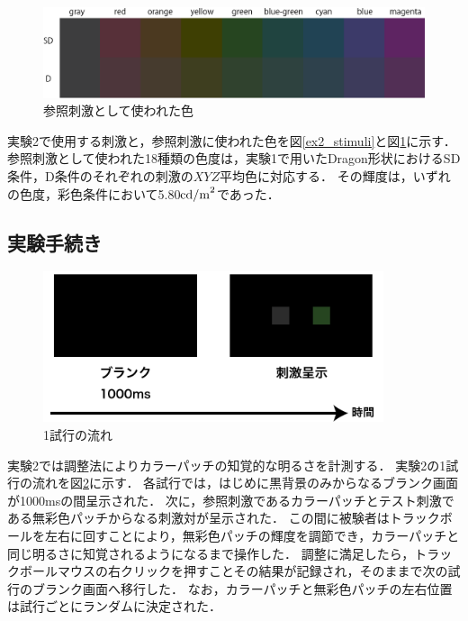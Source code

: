             \begin{figure}[h]
                \centering
                \includegraphics[width=14.0cm]{./img/ex2_stimuli_p.png}
                \caption{参照刺激として使われた色}
                \label{ex2_stimuli_set}
            \end{figure}
            \newpage

            実験2で使用する刺激と，参照刺激に使われた色を図\ref{ex2_stimuli}と図\ref{ex2_stimuli_set}に示す．
            参照刺激として使われた18種類の色度は，実験1で用いたDragon形状におけるSD条件，D条件のそれぞれの刺激の$XYZ$平均色に対応する．
            その輝度は，いずれの色度，彩色条件において5.80${\rm cd/m}^2$であった．

        \subsection{実験手続き}

            \begin{figure}[h]
                \centering
                \includegraphics[width=10.0cm]{./img/ex2_procedure.png}
                \caption{1試行の流れ}
                \label{ex2_procedure}
            \end{figure}

            実験2では調整法によりカラーパッチの知覚的な明るさを計測する．
            実験2の1試行の流れを図\ref{ex2_procedure}に示す．
            各試行では，はじめに黒背景のみからなるブランク画面が1000msの間呈示された．
            次に，参照刺激であるカラーパッチとテスト刺激である無彩色パッチからなる刺激対が呈示された．
            この間に被験者はトラックボールを左右に回すことにより，無彩色パッチの輝度を調節でき，カラーパッチと同じ明るさに知覚されるようになるまで操作した．
            調整に満足したら，トラックボールマウスの右クリックを押すことその結果が記録され，そのままで次の試行のブランク画面へ移行した．
            なお，カラーパッチと無彩色パッチの左右位置は試行ごとにランダムに決定された．

